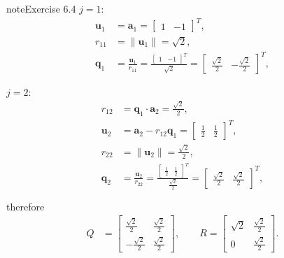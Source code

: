 \documentclass[letterpaper,10pt,english]{jupyterBook}
\begin{document}
\begin{sphinxadmonition}{note}{Exercise 6.4}
\sphinxAtStartPar
\(j = 1\):
\begin{align*}
    \mathbf{u}_{1} &= \mathbf{a}_{1} = \left[\begin{matrix}1 & -1\end{matrix}\right]^T, \\
    r_{11} &= \| \mathbf{u}_{1} \| = \sqrt{2}, \\
    \mathbf{q}_{1} &= \frac{\mathbf{u}_{1}}{r_{11}} = \frac{\left[\begin{matrix}1 & -1\end{matrix}\right]^T}{\sqrt{2}} = \left[\begin{matrix}\frac{\sqrt{2}}{2} & - \frac{\sqrt{2}}{2}\end{matrix}\right]^T, \\
     \\
\end{align*}
\sphinxAtStartPar
\(j = 2\):
\begin{align*}
    r_{12} &= \mathbf{q}_{1} \cdot \mathbf{a}_{2} = \frac{\sqrt{2}}{2}, \\
    \mathbf{u}_{2} &= \mathbf{a}_{2} - r_{12} \mathbf{q}_{1} = \left[\begin{matrix}\frac{1}{2} & \frac{1}{2}\end{matrix}\right]^T, \\
    r_{22} &= \| \mathbf{u}_{2} \| = \frac{\sqrt{2}}{2}, \\
    \mathbf{q}_{2} &= \frac{\mathbf{u}_{2}}{r_{22}} = \frac{\left[\begin{matrix}\frac{1}{2} & \frac{1}{2}\end{matrix}\right]^T}{\frac{\sqrt{2}}{2}} = \left[\begin{matrix}\frac{\sqrt{2}}{2} & \frac{\sqrt{2}}{2}\end{matrix}\right]^T, \\
     \\
\end{align*}
\sphinxAtStartPar
therefore
\begin{align*}
    Q &= \left[\begin{matrix}\frac{\sqrt{2}}{2} & \frac{\sqrt{2}}{2}\\- \frac{\sqrt{2}}{2} & \frac{\sqrt{2}}{2}\end{matrix}\right], \qquad R = \left[\begin{matrix}\sqrt{2} & \frac{\sqrt{2}}{2}\\0 & \frac{\sqrt{2}}{2}\end{matrix}\right].
\end{align*}
\sphinxAtStartPar

\end{sphinxadmonition}
\end{document}
